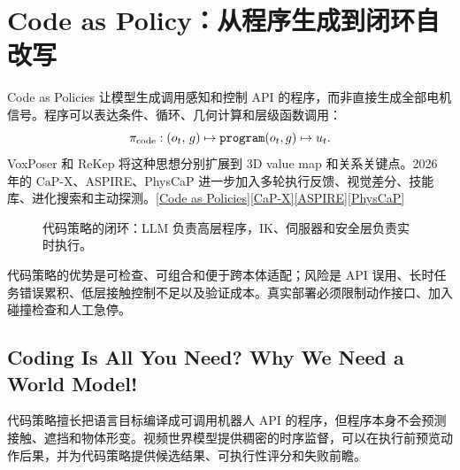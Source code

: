 \documentclass[UTF8,a4paper,11pt]{ctexart}
\begin{document}
\section{Code as Policy：从程序生成到闭环自改写}
Code as Policies 让模型生成调用感知和控制 API 的程序，而非直接生成全部电机信号。程序可以表达条件、循环、几何计算和层级函数调用：
\[
 \pi_{\rm code}: (o_t,\,g)\mapsto \texttt{program}(o_t,g)\mapsto u_t.
\]
VoxPoser 和 ReKep 将这种思想分别扩展到 3D value map 和关系关键点。2026 年的 CaP-X、ASPIRE、PhysCaP 进一步加入多轮执行反馈、视觉差分、技能库、进化搜索和主动探测。\href{https://code-as-policies.github.io/}{[Code as Policies]}\;\href{https://arxiv.org/abs/2603.22435}{[CaP-X]}\;\href{https://arxiv.org/abs/2607.00272}{[ASPIRE]}\;\href{https://arxiv.org/abs/2608.21031}{[PhysCaP]}

\begin{figure}[ht]
\centering
{}
\caption{代码策略的闭环：LLM 负责高层程序，IK、伺服器和安全层负责实时执行。}
\end{figure}

\begin{caveat}
代码策略的优势是可检查、可组合和便于跨本体适配；风险是 API 误用、长时任务错误累积、低层接触控制不足以及验证成本。真实部署必须限制动作接口、加入碰撞检查和人工急停。
\end{caveat}

\subsection{Coding Is All You Need? Why We Need a World Model!}
代码策略擅长把语言目标编译成可调用机器人 API 的程序，但程序本身不会预测接触、遮挡和物体形变。视频世界模型提供稠密的时序监督，可以在执行前预览动作后果，并为代码策略提供候选结果、可执行性评分和失败前瞻。
\end{document}
